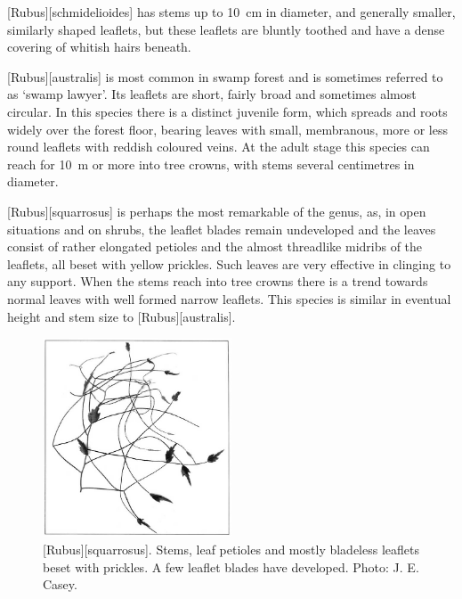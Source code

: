 [Rubus][schmidelioides] has stems up to \SI{10}{\centi\metre} in diameter, and generally smaller, similarly shaped leaflets, but these leaflets are bluntly toothed and have a dense covering of whitish hairs beneath.

[Rubus][australis] is most common in swamp forest and is sometimes referred to as `swamp lawyer'.
Its leaflets are short, fairly broad and sometimes almost circular.
In this species there is a distinct juvenile form, which spreads and roots widely over the forest floor, bearing leaves with small, membranous, more or less round leaflets with reddish coloured veins.
At the adult stage this species can reach for \SI{10}{\metre} or more into tree crowns, with stems several centimetres in diameter.

[Rubus][squarrosus] is perhaps the most remarkable of the genus, as, in open situations and on shrubs, the leaflet blades remain undeveloped and the leaves consist of rather elongated petioles and the almost threadlike midribs of the leaflets, all beset with yellow prickles.
Such leaves are very effective in clinging to any support.
When the stems reach into tree crowns there is a trend towards normal leaves with well formed narrow leaflets.
This species is similar in eventual height and stem size to [Rubus][australis].

\begin{figure}
	\includegraphics[width=0.5\textwidth]{graphics/figure37rubus.jpg}
	\centering
	\caption[\emph{Rubus squarrosus}]{[Rubus][squarrosus].
	Stems, leaf petioles and mostly bladeless leaflets beset with prickles.
	A few leaflet blades have developed.
	Photo: J. E. Casey.}%
	\label{fig:37rubus}
\end{figure}

